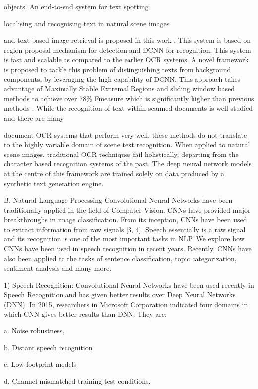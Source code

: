 \documentclass[12pt]{article}
\begin{document}
objects. An end-to-end system for text spotting {localising
and recognising text in natural scene images {and text
based image retrieval is proposed in this work . This
system is based on region proposal mechanism for detection
and DCNN for recognition. This system is fast and scalable
as compared to the earlier OCR systems. A novel
framework is proposed to tackle this problem of
distinguishing texts from background components, by
leveraging the high capability of DCNN. This approach
takes advantage of Maximally Stable Extremal Regions and
sliding window based methods to achieve over 78\% Fmeasure which is significantly higher than previous
methods . While the recognition of text within
scanned documents is well studied and there are many


document OCR systems that perform very well, these
methods do not translate to the highly variable domain of
scene text recognition. When applied to natural scene
images, traditional OCR techniques fail holistically,
departing from the character based recognition systems of
the past. The deep neural network models at the centre of
this framework are trained solely on data produced by a
synthetic text generation engine.

B. Natural Language Processing
Convolutional Neural Networks have been traditionally
applied in the field of Computer Vision. CNNs have
provided major breakthroughs in image classification. From
its inception, CNNs have been used to extract information
from raw signals [3, 4]. Speech essentially is a raw signal
and its recognition is one of the most important tasks in
NLP. We explore how CNNs have been used in speech
recognition in recent years. Recently, CNNs have also been
applied to the tasks of sentence classification, topic
categorization, sentiment analysis and many more.

1) Speech Recognition: Convolutional Neural Networks
have been used recently in Speech Recognition and has
given better results over Deep Neural Networks (DNN). In
2015, researchers in Microsoft Corporation indicated four
domains in which CNN gives better results than DNN.
They are:

a. Noise robustness,

b. Distant speech recognition


c. Low-footprint models

d. Channel-mismatched training-test conditions.

}}
\end{document}
